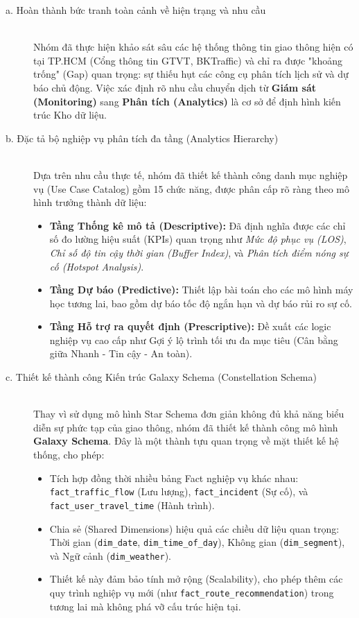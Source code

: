 \begin{description}
    \item[a. Hoàn thành bức tranh toàn cảnh về hiện trạng và nhu cầu] \hfill \\
    Nhóm đã thực hiện khảo sát sâu các hệ thống thông tin giao thông hiện có tại TP.HCM (Cổng thông tin GTVT, BKTraffic) và chỉ ra được "khoảng trống" (Gap) quan trọng: sự thiếu hụt các công cụ phân tích lịch sử và dự báo chủ động. Việc xác định rõ nhu cầu chuyển dịch từ \textbf{Giám sát (Monitoring)} sang \textbf{Phân tích (Analytics)} là cơ sở để định hình kiến trúc Kho dữ liệu.
    
    \item[b. Đặc tả bộ nghiệp vụ phân tích đa tầng (Analytics Hierarchy)] \hfill \\
    Dựa trên nhu cầu thực tế, nhóm đã thiết kế thành công danh mục nghiệp vụ (Use Case Catalog) gồm 15 chức năng, được phân cấp rõ ràng theo mô hình trưởng thành dữ liệu:
    \begin{itemize}
        \item \textbf{Tầng Thống kê mô tả (Descriptive):} Đã định nghĩa được các chỉ số đo lường hiệu suất (KPIs) quan trọng như \textit{Mức độ phục vụ (LOS)}, \textit{Chỉ số độ tin cậy thời gian (Buffer Index)}, và \textit{Phân tích điểm nóng sự cố (Hotspot Analysis)}.
        \item \textbf{Tầng Dự báo (Predictive):} Thiết lập bài toán cho các mô hình máy học tương lai, bao gồm dự báo tốc độ ngắn hạn và dự báo rủi ro sự cố.
        \item \textbf{Tầng Hỗ trợ ra quyết định (Prescriptive):} Đề xuất các logic nghiệp vụ cao cấp như Gợi ý lộ trình tối ưu đa mục tiêu (Cân bằng giữa Nhanh - Tin cậy - An toàn).
    \end{itemize}
    
    \item[c. Thiết kế thành công Kiến trúc Galaxy Schema (Constellation Schema)] \hfill \\
    Thay vì sử dụng mô hình Star Schema đơn giản không đủ khả năng biểu diễn sự phức tạp của giao thông, nhóm đã thiết kế thành công mô hình \textbf{Galaxy Schema}. Đây là một thành tựu quan trọng về mặt thiết kế hệ thống, cho phép:
    \begin{itemize}
        \item Tích hợp đồng thời nhiều bảng Fact nghiệp vụ khác nhau: \texttt{fact\_traffic\_flow} (Lưu lượng), \texttt{fact\_incident} (Sự cố), và \texttt{fact\_user\_travel\_time} (Hành trình).
        \item Chia sẻ (Shared Dimensions) hiệu quả các chiều dữ liệu quan trọng: Thời gian (\texttt{dim\_date}, \texttt{dim\_time\_of\_day}), Không gian (\texttt{dim\_segment}), và Ngữ cảnh (\texttt{dim\_weather}).
        \item Thiết kế này đảm bảo tính mở rộng (Scalability), cho phép thêm các quy trình nghiệp vụ mới (như \texttt{fact\_route\_recommendation}) trong tương lai mà không phá vỡ cấu trúc hiện tại.
    \end{itemize}
    

\end{description}
